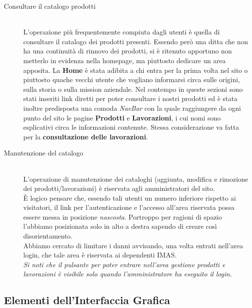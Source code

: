 \documentclass[11pt]{article}
\begin{document}
\begin{description}
	\item [Consultare il catalogo prodotti] \hfill \\
	L'operazione più frequentemente compiuta dagli utenti è quella di consultare il catalogo dei prodotti presenti.
	\hfill 
	Essendo però una ditta che non ha una continuità di rinnovo dei prodotti, si è ritenuto apportuno non metterlo in evidenza nella homepage, ma piuttosto  dedicare un area apposita. 
	La \textbf{Home} è stata adibita a chi entra per la prima volta nel sito o piuttosto quache vecchi utente che vogliano informarsi circa sulle origini, sulla storia o sulla mission aziendale. \hfill
	Nel contempo in queste sezioni sono stati inseriti link diretti per poter consultare i nostri prodotti  ed è stata inoltre predisposta una comoda \textit{NavBar} con la quale raggiungere da ogni punto del sito le pagine \textbf{Prodotti} e \textbf{Lavorazioni}, i cui nomi sono esplicativi circa le informazioni contenute.
	Stessa considerazione va fatta per la \textbf{consultazione delle lavorazioni}.
	\item [Manutenzione del catalogo] \hfill \\
	L'operazione di manutenzione dei cataloghi (aggiunta, modifica e rimozione dei prodotti/lavorazioni) è riservata agli amministratori del sito.\\
	 È logico pensare che, essendo tali utenti un numero inferiore rispetto ai visitatori, il link per l'autenticazione e l'accesso all'area riservata possa essere messa in posizione \textit{nascosta}. Portroppo per ragioni di spazio l'abbiamo posizionata solo in alto a destra sapendo di creare così disorientamento.\\
	 Abbiamo cercato di limitare i danni avvisando,  una volta entrati nell'area login, che tale area è riservata ai dependenti IMAS.\\
	  \textit{Si noti che il pulsante per poter entrare nell'area gestione prodotti e lavorazioni è visibile solo quando  l'amministratore ha eseguito il login.}
\end{description}
\subsection{Elementi dell'Interfaccia Grafica}
\end{document}
